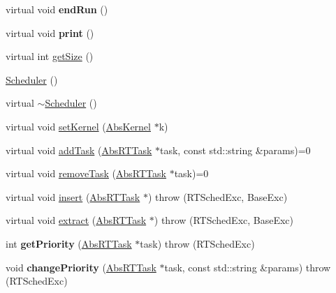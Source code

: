 \begin{DoxyCompactItemize}
\item 
virtual void {\bfseries end\+Run} ()\hypertarget{classRTSim_1_1Scheduler_aabe871be61e2c551cee5cb32b4db4e77}{}\label{classRTSim_1_1Scheduler_aabe871be61e2c551cee5cb32b4db4e77}

\item 
virtual void {\bfseries print} ()\hypertarget{classRTSim_1_1Scheduler_aa88b213ca3f9d499551c862e6883c3db}{}\label{classRTSim_1_1Scheduler_aa88b213ca3f9d499551c862e6883c3db}

\item 
virtual int \hyperlink{classRTSim_1_1Scheduler_a0469b37ca1d71055dff06832a61042aa}{get\+Size} ()
\item 
\hyperlink{classRTSim_1_1Scheduler_a44381f6a65b3b4aeb8f3e609eb89b43e}{Scheduler} ()
\item 
virtual \hyperlink{classRTSim_1_1Scheduler_a1fc0b64a535eddc0cc1954092d47e65b}{$\sim$\+Scheduler} ()
\item 
virtual void \hyperlink{classRTSim_1_1Scheduler_a370ea850bb37c01a22dd5fcf1873c090}{set\+Kernel} (\hyperlink{classRTSim_1_1AbsKernel}{Abs\+Kernel} $\ast$k)
\item 
virtual void \hyperlink{classRTSim_1_1Scheduler_a7b4a2776f1d528c0df09b34e611c6622}{add\+Task} (\hyperlink{classRTSim_1_1AbsRTTask}{Abs\+R\+T\+Task} $\ast$task, const std\+::string \&params)=0
\item 
virtual void \hyperlink{classRTSim_1_1Scheduler_ac16fd71a26168e189e5b6cec3a99be67}{remove\+Task} (\hyperlink{classRTSim_1_1AbsRTTask}{Abs\+R\+T\+Task} $\ast$task)=0
\item 
virtual void \hyperlink{classRTSim_1_1Scheduler_a8e0d0776e16ed44fe88745e03ea7b57a}{insert} (\hyperlink{classRTSim_1_1AbsRTTask}{Abs\+R\+T\+Task} $\ast$)  throw (\+R\+T\+Sched\+Exc, Base\+Exc)
\item 
virtual void \hyperlink{classRTSim_1_1Scheduler_ab332acbd8c9fc07fec3bd2492d888753}{extract} (\hyperlink{classRTSim_1_1AbsRTTask}{Abs\+R\+T\+Task} $\ast$)  throw (\+R\+T\+Sched\+Exc, Base\+Exc)
\item 
int {\bfseries get\+Priority} (\hyperlink{classRTSim_1_1AbsRTTask}{Abs\+R\+T\+Task} $\ast$task)  throw (\+R\+T\+Sched\+Exc)\hypertarget{classRTSim_1_1Scheduler_a178e49e5537823e267bd724cebef4a31}{}\label{classRTSim_1_1Scheduler_a178e49e5537823e267bd724cebef4a31}

\item 
void {\bfseries change\+Priority} (\hyperlink{classRTSim_1_1AbsRTTask}{Abs\+R\+T\+Task} $\ast$task, const std\+::string \&params)  throw (\+R\+T\+Sched\+Exc)\hypertarget{classRTSim_1_1Scheduler_a590075875e8ba96e87c18ce6cc8bbccb}{}\label{classRTSim_1_1Scheduler_a590075875e8ba96e87c18ce6cc8bbccb}


\end{DoxyCompactItemize}
